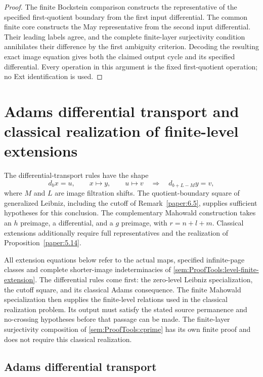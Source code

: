 \begin{proof}
The finite Bockstein comparison constructs the representative of the
specified first-quotient boundary from the first input differential.
The common finite core constructs the May representative from the
second input differential. Their leading labels agree, and the complete
finite-layer surjectivity condition annihilates their difference by the
first ambiguity criterion. Decoding the resulting exact image equation
gives both the claimed output cycle and its specified differential.
Every operation in this argument is the fixed first-quotient operation;
no Ext identification is used.
\end{proof}

\section{Adams differential transport and classical realization of finite-level extensions}

The differential-transport rules have the shape
\[
d_bx=u,\qquad x\longmapsto y,\qquad u\longmapsto v
\quad\Longrightarrow\quad d_{b+L-M}y=v,
\]
where $M$ and $L$ are image filtration shifts. The quotient-boundary
square of generalized Leibniz, including the cutoff of
Remark~\ref{paper:6.5}, supplies sufficient hypotheses for this
conclusion. The complementary Mahowald construction takes an $h$
preimage, a differential, and a $g$ preimage, with $r=n+l+m$.
Classical extensions additionally require full representatives and
the realization of Proposition~\ref{paper:5.14}.

All extension equations below refer to the actual maps, specified
infinite-page classes and complete shorter-image indeterminacies of
\ref{sem:ProofTools:level-finite-extension}. The differential rules
come first: the zero-level Leibniz specialization, the cutoff square,
and its classical Adams consequence. The finite Mahowald specialization
then supplies the finite-level relations used in the classical
realization problem. Its output must satisfy the stated source
permanence and no-crossing hypotheses before that passage can be made.
The finite-layer surjectivity composition of \ref{sem:ProofTools:cprime}
has its own finite proof and does not require this classical realization.

\subsection{Adams differential transport}

